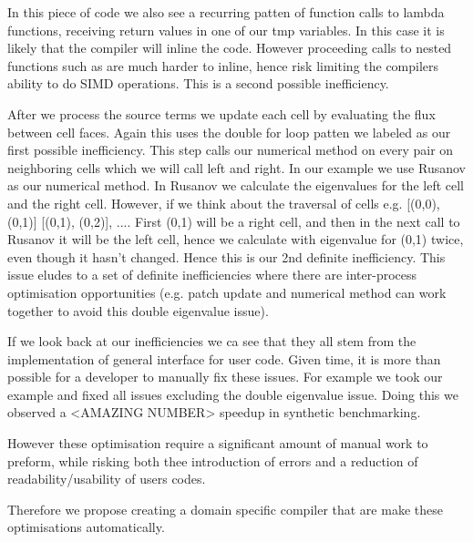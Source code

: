 In this piece of code we also see a recurring patten of function calls to lambda functions, receiving return values in one of our tmp variables.
In this case it is likely that the compiler will inline the code.
However proceeding calls to nested functions such as  are much harder to inline, hence risk limiting the compilers ability to do SIMD operations.    
This is a second possible inefficiency.

After we process the source terms we update each cell by evaluating the flux between cell faces.
Again this uses the double for loop patten we labeled as our first possible inefficiency.
This step calls our numerical method on every pair on neighboring cells which we will call left and right.
In our example we use Rusanov as our numerical method.
In Rusanov we calculate the eigenvalues for the left cell and the right cell.
However, if we think about the traversal of cells e.g. [(0,0), (0,1)] [(0,1), (0,2)], .... First (0,1) will be a right cell, and then in the next call to Rusanov it will be the left cell, hence we calculate with eigenvalue for (0,1) twice, even though it hasn't changed.
Hence this is our 2nd definite inefficiency.
This issue eludes to a set of definite inefficiencies where there are inter-process optimisation opportunities (e.g. patch update and numerical method can work together to avoid this double eigenvalue issue).   


If we look back at our inefficiencies we ca see that they all stem from the implementation of general interface for user code.
Given time, it is more than possible for a developer to manually fix these issues.
For example we took our example and fixed all issues excluding the double eigenvalue issue.
Doing this we observed a <AMAZING NUMBER> speedup in synthetic benchmarking.

However these optimisation require a significant amount of manual work to preform, while risking both thee introduction of errors and a reduction of readability/usability of users codes.

Therefore we propose creating a domain specific compiler that are make these optimisations automatically.


